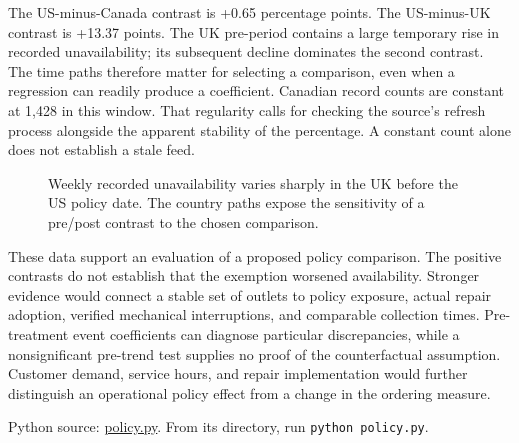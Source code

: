 The US-minus-Canada contrast is +0.65 percentage points. The US-minus-UK
contrast is +13.37 points. The UK pre-period contains a large temporary
rise in recorded unavailability; its subsequent decline dominates the
second contrast. The time paths therefore matter for selecting a
comparison, even when a regression can readily produce a coefficient.
Canadian record counts are constant at 1,428 in this window. That
regularity calls for checking the source's refresh process alongside the
apparent stability of the percentage. A constant count alone does not
establish a stale feed.

\begin{figure}[htbp]
\centering

\caption{Weekly recorded unavailability varies sharply in the UK before the US policy date. The country paths expose the sensitivity of a pre/post contrast to the chosen comparison.}\label{fig:M06_mcbroken_policy}
\end{figure}

These data support an evaluation of a proposed policy comparison. The
positive contrasts do not establish that the exemption worsened
availability. Stronger evidence would connect a stable set of outlets to
policy exposure, actual repair adoption, verified mechanical
interruptions, and comparable collection times. Pre-treatment event
coefficients can diagnose particular discrepancies, while a
nonsignificant pre-trend test supplies no proof of the counterfactual
assumption. Customer demand, service hours, and repair implementation
would further distinguish an operational policy effect from a change in
the ordering measure.

\FloatBarrier
{}
Python source: \href{../03_Data_and_Code/McBroken/policy.py}{policy.py}.
From its directory, run \texttt{python\ policy.py}.

